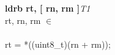 


\begin{instructionblock}{\imagewidth}%
    \textbf{ldrb rt, [ rn, rm ]}\hfill\textit{T1}\\
    rt, rn, rm $\in$ \baseregisters\\
    {}\\
    rt = *((uint8\_t)(rn + rm));
\end{instructionblock}

